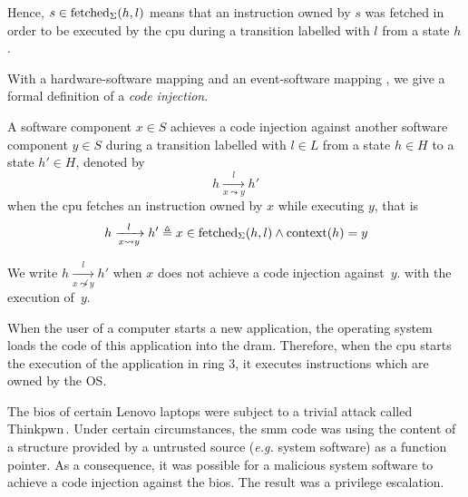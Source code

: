 Hence, $s \in \mathrm{fetched}_{\Sigma}(h, l)$ means that an instruction owned by
$s$ was fetched in order to be executed by the \ac{cpu} during a transition
labelled with $l$ from a state $h$.

With a hardware-software mapping and an event-software mapping , we give a formal
definition of a \textit{code injection}.

\begin{definition}
  \label{def:speccert:tempering}
  A software component $x \in S$ achieves a code injection against another
  software component $y \in S$ during a transition labelled with $l \in L$ from
  a state $h \in H$ to a state $h' \in H$, denoted by
  \[
    h \xrightarrow[x \leadsto y]{l} h'
  \]
  when the \ac{cpu} fetches an instruction owned by $x$ while executing $y$,
  that is
  \[
    h \xrightarrow[x \leadsto y]{l} h' \triangleq x \in
    \mathrm{fetched}_{\Sigma}(h, l) \wedge \mathrm{context}(h) = y
  \]

  We write $h \xrightarrow[x \not\leadsto y]{l} h'$ when $x$ does not achieve a
  code injection against~$y$.  with the execution of~$y$. 
\end{definition}

\begin{example}
  When the user of a computer starts a new application, the operating system
  loads the code of this application into the \ac{dram}. Therefore, when the
  \ac{cpu} starts the execution of the application in ring 3, it executes
  instructions which are owned by the OS.  
\end{example}

\begin{example}
  The \ac{bios} of certain Lenovo laptops were subject to a trivial attack
  called Thinkpwn\,\cite{cr4sh2016thinkpwn}.
  Under certain circumstances, the \ac{smm} code was using the content of a
  structure provided by a untrusted source (\emph{e.g.} system software) as a
  function pointer.
  As a consequence, it was possible for a malicious system software to achieve a
  code injection against the \ac{bios}.
  The result was a privilege escalation.
\end{example}

